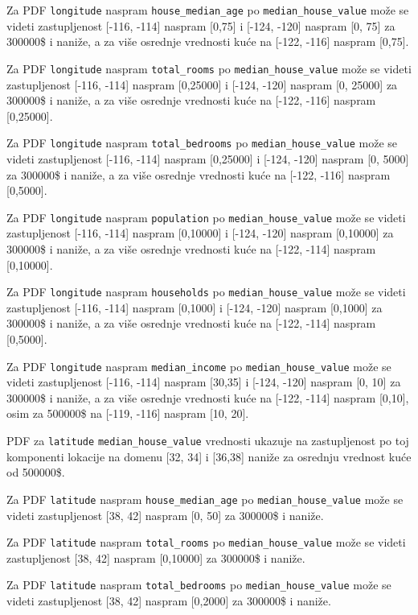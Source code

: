 \documentclass[fontsize=12bp, paper=a4]{scrarticle}
\begin{document}
Za PDF \verb*|longitude| naspram \verb*|house_median_age| po \verb|median_house_value| može se videti zastupljenost [-116, -114] naspram [0,75] i [-124, -120] naspram [0, 75] za 300000\$ i naniže, a za više osrednje vrednosti kuće na [-122, -116] naspram [0,75].


Za PDF \verb*|longitude| naspram \verb*|total_rooms| po \verb|median_house_value| može se videti zastupljenost [-116, -114] naspram [0,25000] i [-124, -120] naspram [0, 25000] za 300000\$ i naniže, a za više osrednje vrednosti kuće na [-122, -116] naspram [0,25000].

Za PDF \verb*|longitude| naspram \verb*|total_bedrooms| po \verb|median_house_value|  može se videti zastupljenost [-116, -114] naspram [0,25000] i [-124, -120] naspram [0, 5000] za 300000\$ i naniže, a za više osrednje vrednosti kuće na [-122, -116] naspram [0,5000].

Za PDF \verb*|longitude| naspram \verb*|population| po \verb|median_house_value| može se videti zastupljenost [-116, -114] naspram [0,10000] i [-124, -120] naspram [0,10000] za 300000\$ i naniže, a za više osrednje vrednosti kuće na [-122, -114] naspram [0,10000].

Za PDF \verb*|longitude| naspram \verb*|households| po \verb|median_house_value| može se videti zastupljenost [-116, -114] naspram [0,1000] i [-124, -120] naspram [0,1000] za 300000\$ i naniže, a za više osrednje vrednosti kuće na [-122, -114] naspram [0,5000].

Za PDF \verb*|longitude| naspram \verb*|median_income| po \verb|median_house_value| može se videti zastupljenost [-116, -114] naspram [30,35] i [-124, -120] naspram [0, 10] za 300000\$ i naniže, a za više osrednje vrednosti kuće na [-122, -114] naspram [0,10], osim za 500000\$ na [-119, -116] naspram [10, 20].

PDF za \verb*|latitude| \verb*|median_house_value| vrednosti ukazuje na zastupljenost po toj komponenti lokacije na domenu [32, 34] i [36,38] naniže za osrednju vrednost kuće od 500000\$.

Za PDF \verb*|latitude| naspram \verb*|house_median_age| po \verb|median_house_value| može se videti zastupljenost [38, 42] naspram [0, 50] za 300000\$ i naniže.

Za PDF \verb*|latitude| naspram \verb*|total_rooms| po \verb|median_house_value| može se videti zastupljenost [38, 42] naspram [0,10000] za 300000\$ i naniže.

Za PDF \verb*|latitude| naspram \verb*|total_bedrooms| po \verb|median_house_value| može se videti zastupljenost [38, 42] naspram [0,2000] za 300000\$ i naniže.
\end{document}
